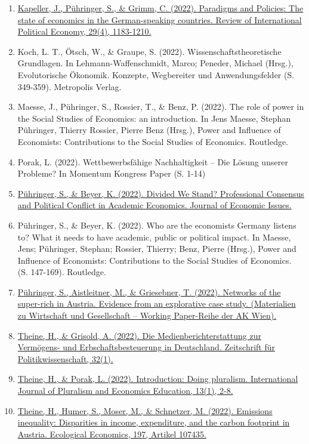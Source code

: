 \begin{enumerate}
	 \item \href{https://doi.org/10.1080/09692290.2021.1904269}{Kapeller, J., Pühringer, S., \& Grimm, C. (2022). Paradigms and Policies: The state of economics in the German-speaking countries. Review of International Political Economy, 29(4), 1183-1210.}
	 \item Koch, L. T., Ötsch, W., \& Graupe, S. (2022). Wissenschaftstheoretische Grundlagen. In Lehmann-Waffenschmidt, Marco; Peneder, Michael (Hrsg.), Evolutorische Ökonomik. Konzepte, Wegbereiter und Anwendungsfelder (S. 349-359). Metropolis Verlag.
	 \item Maesse, J., Pühringer, S., Rossier, T., \& Benz, P. (2022). The role of power in the Social Studies of Economics: an introduction. In Jens Maesse, Stephan Pühringer, Thierry Rossier,  Pierre Benz (Hrsg.), Power and Influence of Economists: Contributions to the Social Studies of Economics. Routledge.
	 \item Porak, L. (2022). Wettbewerbsfähige Nachhaltigkeit – Die Lösung unserer Probleme? In Momentum Kongress Paper (S. 1-14)
	 \item \href{https://doi.org/10.2139/ssrn.3425768}{Pühringer, S., \& Beyer, K. (2022). Divided We Stand? Professional Consensus and Political Conflict in Academic Economics. Journal of Economic Issues.}
	 \item Pühringer, S., \& Beyer, K. (2022). Who are the economists Germany listens to? What it needs to have academic, public or political impact. In Maesse, Jens; Pühringer, Stephan; Rossier, Thierry; Benz, Pierre (Hrsg.), Power and Influence of Economists: Contributions to the Social Studies of Economics. (S. 147-169). Routledge.
	 \item \href{https://emedien.arbeiterkammer.at/viewer/image/AC16689081/}{Pühringer, S., Aistleitner, M., \& Griesebner, T. (2022). Networks of the super-rich in Austria. Evidence from an explorative case study. (Materialien zu Wirtschaft und Gesellschaft --  Working Paper-Reihe der AK Wien).}
	 \item \href{https://doi.org/10.1007/s41358-022-00314-6}{Theine, H., \& Grisold, A. (2022). Die Medienberichterstattung zur Vermögens- und Erbschaftsbesteuerung in Deutschland. Zeitschrift für Politikwissenschaft, 32(1).}
	 \item \href{http://www.scopus.com/inward/record.url?scp=85135757403&partnerID=8YFLogxK}{Theine, H., \& Porak, L. (2022). Introduction: Doing pluralism. International Journal of Pluralism and Economics Education, 13(1), 2-8.}
	 \item \href{https://doi.org/10.1016/j.ecolecon.2022.107435}{Theine, H., Humer, S., Moser, M., \& Schnetzer, M. (2022). Emissions inequality: Disparities in income, expenditure, and the carbon footprint in Austria. Ecological Economics, 197, Artikel 107435.}
\end{enumerate}
